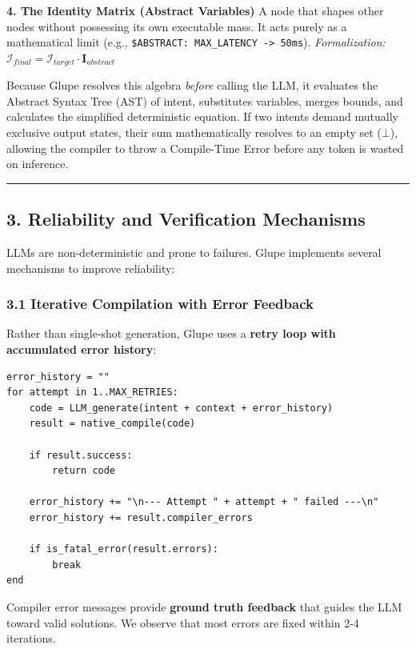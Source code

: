 \documentclass[11pt, a4paper]{article}
\begin{document}
\textbf{4. The Identity Matrix (Abstract Variables)} A node that shapes
other nodes without possessing its own executable mass. It acts purely
as a mathematical limit (e.g.,
\texttt{\$ABSTRACT:\ MAX\_LATENCY\ -\textgreater{}\ 50ms}).
\emph{Formalization:}
\(\mathcal{I}_{final} = \mathcal{I}_{target} \cdot \mathbf{I}_{abstract}\)

Because Glupe resolves this algebra \emph{before} calling the LLM, it
evaluates the Abstract Syntax Tree (AST) of intent, substitutes
variables, merges bounds, and calculates the simplified deterministic
equation. If two intents demand mutually exclusive output states, their
sum mathematically resolves to an empty set (\(\bot\)), allowing the
compiler to throw a Compile-Time Error before any token is wasted on
inference.

\begin{center}\rule{0.5\linewidth}{0.5pt}\end{center}

\subsection{3. Reliability and Verification
Mechanisms}\label{reliability-and-verification-mechanisms}

LLMs are non-deterministic and prone to failures. Glupe implements
several mechanisms to improve reliability:

\subsubsection{3.1 Iterative Compilation with Error
Feedback}\label{iterative-compilation-with-error-feedback}

Rather than single-shot generation, Glupe uses a \textbf{retry loop with
accumulated error history}:

\begin{verbatim}
error_history = ""
for attempt in 1..MAX_RETRIES:
    code = LLM_generate(intent + context + error_history)
    result = native_compile(code)
    
    if result.success:
        return code
    
    error_history += "\n--- Attempt " + attempt + " failed ---\n"
    error_history += result.compiler_errors
    
    if is_fatal_error(result.errors):
        break
end
\end{verbatim}

Compiler error messages provide \textbf{ground truth feedback} that
guides the LLM toward valid solutions. We observe that most errors are
fixed within 2-4 iterations.
\end{document}
